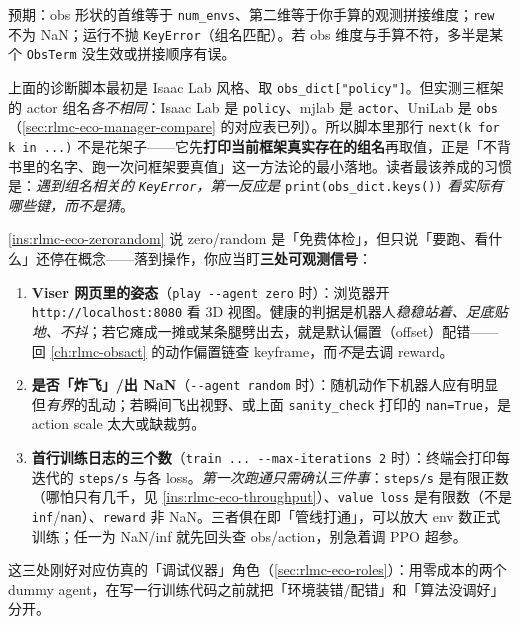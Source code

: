 预期：obs 形状的首维等于 \verb|num_envs|、第二维等于你手算的观测拼接维度；\verb|rew| 不为 NaN；运行不抛 \verb|KeyError|（组名匹配）。若 obs 维度与手算不符，多半是某个 \verb|ObsTerm| 没生效或拼接顺序有误。

\begin{pitfall}
上面的诊断脚本最初是 Isaac Lab 风格、取 \verb|obs_dict["policy"]|。但实测三框架的 actor 组名\emph{各不相同}：Isaac Lab 是 \verb|policy|、mjlab 是 \verb|actor|、UniLab 是 \verb|obs|（\cref{sec:rlmc-eco-manager-compare} 的对应表已列）。所以脚本里那行 \verb|next(k for k in ...)| 不是花架子——它先\textbf{打印当前框架真实存在的组名}再取值，正是「不背书里的名字、跑一次问框架要真值」这一方法论的最小落地。读者最该养成的习惯是：\emph{遇到组名相关的 \texttt{KeyError}，第一反应是} \verb|print(obs_dict.keys())| \emph{看实际有哪些键，而不是猜}。
\end{pitfall}

\begin{insight}\label{ins:rlmc-eco-smoke-read}
\cref{ins:rlmc-eco-zerorandom} 说 zero/random 是「免费体检」，但只说「要跑、看什么」还停在概念——落到操作，你应当盯\textbf{三处可观测信号}：
\begin{enumerate}
  \item \textbf{Viser 网页里的姿态}（\verb|play --agent zero| 时）：浏览器开 \verb|http://localhost:8080| 看 3D 视图。健康的判据是机器人\emph{稳稳站着、足底贴地、不抖}；若它瘫成一摊或某条腿劈出去，就是默认偏置（offset）配错——回 \cref{ch:rlmc-obsact} 的动作偏置链查 keyframe，而\emph{不}是去调 reward。
  \item \textbf{是否「炸飞」/出 NaN}（\verb|--agent random| 时）：随机动作下机器人应有明显但\emph{有界}的乱动；若瞬间飞出视野、或上面 \verb|sanity_check| 打印的 \verb|nan=True|，是 action scale 太大或缺裁剪。
  \item \textbf{首行训练日志的三个数}（\verb|train ... --max-iterations 2| 时）：终端会打印每迭代的 \verb|steps/s| 与各 loss。\emph{第一次跑通只需确认三件事}：\verb|steps/s| 是有限正数（哪怕只有几千，见 \cref{ins:rlmc-eco-throughput}）、\verb|value loss| 是有限数（不是 \verb|inf|/\verb|nan|）、\verb|reward| 非 NaN。三者俱在即「管线打通」，可以放大 env 数正式训练；任一为 NaN/inf 就先回头查 obs/action，别急着调 PPO 超参。
\end{enumerate}
这三处刚好对应仿真的「调试仪器」角色（\cref{sec:rlmc-eco-roles}）：用零成本的两个 dummy agent，在写一行训练代码之前就把「环境装错/配错」和「算法没调好」分开。
\end{insight}

